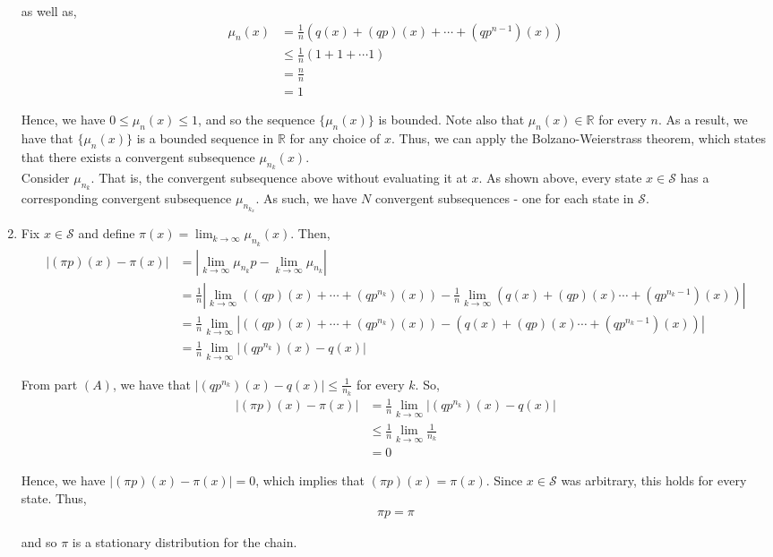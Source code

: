 \documentclass[12pt]{article}
\begin{document}
\begin{enumerate}[label=(\Alph*)]
as well as,
\begin{align*}
\mu_n(x) &= \frac{1}{n} (q(x) + (qp)(x) + \cdots + (qp^{n-1})(x))\\
&\leq \frac{1}{n}(1 + 1 + \cdots 1)\\
&= \frac{n}{n}\\
&= 1
\end{align*}

Hence, we have $0 \leq \mu_n(x) \leq 1$, and so the sequence $\{\mu_n(x)\}$ is bounded. Note also that $\mu_n(x) \in \mathbb{R}$ for every $n$. As a result, we have that $\{\mu_n(x)\}$ is a bounded sequence in $\mathbb{R}$ for any choice of $x$. Thus, we can apply the Bolzano-Weierstrass theorem, which states that there exists a convergent subsequence $\mu_{n_k}(x)$.\\

Consider $\mu_{n_k}$. That is, the convergent subsequence above without evaluating it at $x$. As shown above, every state $x \in \mathcal{S}$ has a corresponding convergent subsequence $\mu_{n_{k_x}}$. As such, we have $N$ convergent subsequences - one for each state in $\mathcal{S}$.

\item Fix $x \in \mathcal{S}$ and define $\pi(x) = \lim_{k \to \infty} \mu_{n_k}(x)$. Then,
\begin{align*}
|(\pi p)(x) - \pi (x)| &= |\lim_{k \to \infty} \mu_{n_k} p - \lim_{k \to \infty} \mu_{n_k}|\\
&= \frac{1}{n} |\lim_{k \to \infty} ((qp)(x) + \cdots + (qp^{n_k})(x)) - \frac{1}{n} \lim_{k \to \infty} (q(x) + (qp)(x) \cdots + (qp^{n_k-1})(x))|\\
&= \frac{1}{n} \lim_{k \to \infty} |((qp)(x) + \cdots + (qp^{n_k})(x)) - (q(x) + (qp)(x) \cdots + (qp^{n_k-1})(x))|\\
&= \frac{1}{n} \lim_{k \to \infty} |(qp^{n_k})(x) - q(x)|
\end{align*}

From part $(A)$, we have that $|(qp^{n_k})(x) - q(x)| \leq \frac{1}{n_k}$ for every $k$. So,
\begin{align*}
|(\pi p)(x) - \pi (x)|  &= \frac{1}{n} \lim_{k \to \infty} |(qp^{n_k})(x) - q(x)|\\
&\leq \frac{1}{n} \lim_{k \to \infty} \frac{1}{n_k}\\
&= 0
\end{align*}

Hence, we have $|(\pi p)(x) - \pi(x)| = 0$, which implies that $(\pi p)(x) = \pi(x)$. Since $x \in \mathcal{S}$ was arbitrary, this holds for every state. Thus,
\begin{align*}
\pi p = \pi
\end{align*}

and so $\pi$ is a stationary distribution for the chain.

\end{enumerate}
\end{document}
